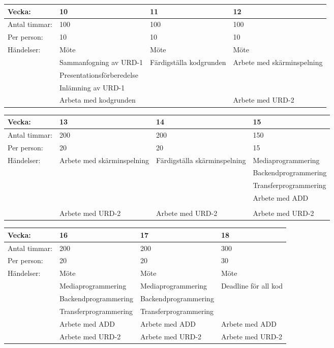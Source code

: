 \begin{tabular}{ | p{65pt} || p{110pt} | p{110pt} | p{110pt} |}
  \hline
  Vecka: & 10 & 11 & 12  \\ \hline
  Antal timmar: & 100 & 100 & 100 \\ \hline
  Per person: & 10 & 10 & 10 \\ \hline
  Händelser: & Möte & Möte & Möte\\ \hline
  & Sammanfogning av URD-1 & Färdigställa kodgrunden & Arbete med skärminspelning\\ \hline
  & Presentationsförberedelse &  &  \\ \hline
  & Inlämning av URD-1 &  &  \\ \hline
  & Arbeta med kodgrunden &  & Arbete med URD-2 \\ \hline
\end{tabular}

\begin{tabular}{ | p{65pt} || p{110pt} | p{110pt} | p{110pt} |}
  \hline
  Vecka: & 13 & 14 & 15  \\ \hline
  Antal timmar: & 200 & 200 & 150 \\ \hline
  Per person: & 20 & 20 & 15 \\ \hline
  Händelser: & Arbete med skärminspelning & Färdigställa skärminspelning & Mediaprogrammering \\ \hline
  &  &  & Backendprogrammering \\ \hline
  &  &  & Transferprogrammering \\ \hline
  &  &  & Arbete med ADD \\ \hline
  &  &  &  \\ \hline
  & Arbete med URD-2 & Arbete med URD-2 & Arbete med URD-2\\ \hline
\end{tabular}

\begin{tabular}{ | p{65pt} || p{110pt} | p{110pt} | p{110pt} |}
  \hline
  Vecka: & 16 & 17 & 18  \\ \hline
  Antal timmar: & 200 & 200 & 300 \\ \hline
  Per person: & 20 & 20 & 30 \\ \hline
  Händelser: & Möte & Möte & Möte \\ \hline
  & Mediaprogrammering & Mediaprogrammering & Deadline för all kod \\ \hline
  & Backendprogrammering & Backendprogrammering &  \\ \hline
  & Transferprogrammering & Transferprogrammering &  \\ \hline
  & Arbete med ADD & Arbete med ADD & Arbete med ADD \\ \hline
  & Arbete med URD-2 & Arbete med URD-2 & Arbete med URD-2\\ \hline
\end{tabular}

